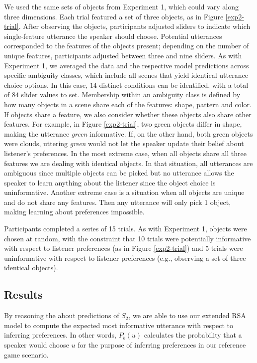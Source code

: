 \documentclass[10pt,a4paper]{article}
\begin{document}
We used the same sets of objects from Experiment 1, which could vary along three dimensions. Each trial featured a set of three objects, as in Figure \ref{exp2-trial}. After observing the objects, participants adjusted sliders to indicate which single-feature utterance the speaker should choose. Potential utterances corresponded to the features of the objects present; depending on the number of unique features, participants adjusted between three and nine sliders. As with Experiment 1, we averaged the data and the respective model predictions across specific ambiguity classes, which include all scenes that yield identical utterance choice options. 
In this case, $14$ distinct conditions can be identified, with a total of $84$ slider values to set. 
Membership within an ambiguity class is defined by how many objects in a scene share each of the features: shape, pattern and color. If objects share a feature, we also consider whether these objects also share other features. For example, in Figure \ref{exp2-trial}, two green objects differ in shape, making the utterance \textit{green} informative. If, on the other hand, both green objects were clouds, uttering \textit{green} would not let the speaker update their belief about listener's preferences.
In the most extreme case, when all objects share all three features we are dealing with identical objects. In that situation, all utterances are ambiguous since multiple objects can be picked but no utterance allows the speaker to learn anything about the listener since the object choice is uninformative. Another extreme case is a situation when all objects are unique and do not share any features. Then any utterance will only pick 1 object, making learning about preferences impossible.

Participants completed a series of 15 trials. As with Experiment 1, objects were chosen at random, with the constraint that 10 trials were potentially informative with respect to listener preferences (as in Figure \ref{exp2-trial}) and 5 trials were uninformative with respect to listener preferences (e.g., observing a set of three identical objects).



\subsection{Results}


By reasoning the about predictions of $S_2$, we are able to use our extended RSA model to compute the expected most informative utterance with respect to inferring preferences. In other words, $P_b(u)$ calculates the probability that a speaker would choose $u$ for the purpose of inferring preferences in our reference game scenario.
\end{document}
